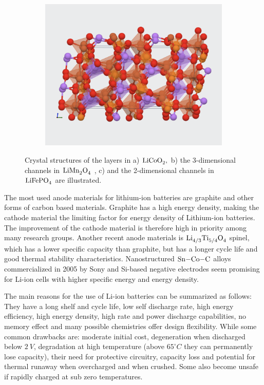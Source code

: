 \begin{figure}[H]
\begin{subfigure}{0.30\textwidth}
        \includegraphics[width=\linewidth]{LiFePO4.png}
        \caption{}
        \label{fig:LiFePO4}
    \end{subfigure}
	\caption{Crystal structures of the layers in a) $\ce{LiCoO_2}, $ \cite{wiki:LiCoO2} b) the 3-dimensional channels in $\ce{LiMn_2O_4}$ \cite{zhang2013understanding}, c) and the 2-dimensional channels in $\ce{LiFePO_4}$ \cite{materialsproject:LiFePO4} are illustrated.}
	\label{fig:Li_a-c}
\end{figure}

The most used anode materials for lithium-ion batteries are graphite and other forms of carbon based materials. Graphite has a high energy density, making the cathode material the limiting factor for energy density of Lithium-ion batteries. The improvement of the cathode material is therefore high in priority among many research groups. Another recent anode materials is $\ce{Li_{4/3}Ti_{5/4}O_4}$ spinel, which has a lower specific capacity than graphite, but has a longer cycle life and good thermal stability characteristics. Nanostructured $\ce{Sn-Co-C}$ alloys commercialized in 2005 by Sony and Si-based negative electrodes seem promising for Li-ion cells with higher specific energy and energy density.

The main reasons for the use of Li-ion batteries can be summarized as follows: They have a long shelf and cycle life, low self discharge rate, high energy efficiency, high energy density, high rate and power discharge capabilities, no memory effect and many possible chemistries offer design flexibility. While some common drawbacks are: moderate initial cost, degeneration when discharged below $\SI{2}{V}$, degradation at high temperature (above $65^{\circ}\si{C}$ they can permanently lose capacity), their need for protective circuitry, capacity loss and potential for thermal runaway when overcharged and when crushed. Some also become unsafe if rapidly charged at sub zero temperatures.

